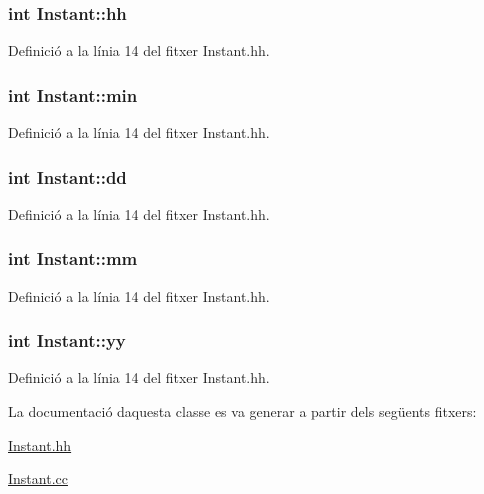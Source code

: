 \subsubsection[{hh}]{\setlength{\rightskip}{0pt plus 5cm}int Instant\+::hh\hspace{0.3cm}{\ttfamily [private]}}\label{class_instant_a56ada80c1afff9825a0003f7253795d1}


Definició a la línia 14 del fitxer Instant.\+hh.

\hypertarget{class_instant_a4de33b0ded8540ec7a903ab5763eccca}{}
\subsubsection[{min}]{\setlength{\rightskip}{0pt plus 5cm}int Instant\+::min\hspace{0.3cm}{\ttfamily [private]}}\label{class_instant_a4de33b0ded8540ec7a903ab5763eccca}


Definició a la línia 14 del fitxer Instant.\+hh.

\hypertarget{class_instant_acc6e1db1f2f2f12a87a865d6849f1b2b}{}
\subsubsection[{dd}]{\setlength{\rightskip}{0pt plus 5cm}int Instant\+::dd\hspace{0.3cm}{\ttfamily [private]}}\label{class_instant_acc6e1db1f2f2f12a87a865d6849f1b2b}


Definició a la línia 14 del fitxer Instant.\+hh.

\hypertarget{class_instant_a2912b4df6ae47c81da8f5e041ddc2266}{}
\subsubsection[{mm}]{\setlength{\rightskip}{0pt plus 5cm}int Instant\+::mm\hspace{0.3cm}{\ttfamily [private]}}\label{class_instant_a2912b4df6ae47c81da8f5e041ddc2266}


Definició a la línia 14 del fitxer Instant.\+hh.

\hypertarget{class_instant_a67fe547756040a8d5d9088c9827bedba}{}
\subsubsection[{yy}]{\setlength{\rightskip}{0pt plus 5cm}int Instant\+::yy\hspace{0.3cm}{\ttfamily [private]}}\label{class_instant_a67fe547756040a8d5d9088c9827bedba}


Definició a la línia 14 del fitxer Instant.\+hh.



La documentació d\textquotesingle{}aquesta classe es va generar a partir dels següents fitxers\+:\begin{DoxyCompactItemize}
\item 
\hyperlink{_instant_8hh}{Instant.\+hh}\item 
\hyperlink{_instant_8cc}{Instant.\+cc}\end{DoxyCompactItemize}
